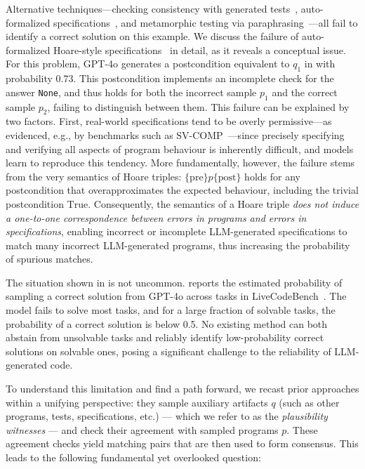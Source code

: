 \documentclass[acmsmall,screen,nonacm]{acmart}
\begin{document}
Alternative techniques---checking consistency with generated tests~\cite{chen2022codet}, auto-formalized specifications~\cite{endres2024can,misu2024towards}, and metamorphic testing via paraphrasing~\cite{wang2024validating}---all fail to identify a correct solution on this example. We discuss the failure of auto-formalized Hoare-style specifications~\cite{hoare1969axiomatic} in detail, as it reveals a conceptual issue. For this problem, GPT-4o generates a postcondition equivalent to $q_1$ in  with probability 0.73. This postcondition implements an incomplete check for the answer \texttt{None}, and thus holds for both the incorrect sample $p_1$ and the correct sample $p_2$, failing to distinguish between them. This failure can be explained by two factors. First, real-world specifications tend to be overly permissive---as evidenced, e.g., by benchmarks such as SV-COMP~\cite{beyer2012competition}---since precisely specifying and verifying all aspects of program behaviour is inherently difficult, and models learn to reproduce this tendency. More fundamentally, however, the failure stems from the very semantics of Hoare triples: $\{\mathrm{pre}\} p \{\mathrm{post}\}$ holds for any postcondition that overapproximates the expected behaviour, including the trivial postcondition $\mathrm{True}$. Consequently, the semantics of a Hoare triple \emph{does not induce a one-to-one correspondence between errors in programs and errors in specifications}, enabling incorrect or incomplete LLM-generated specifications to match many incorrect LLM-generated programs, thus increasing the probability of spurious matches.


The situation shown in  is not uncommon.  reports the estimated probability of sampling a correct solution from GPT-4o across tasks in LiveCodeBench~\cite{jain2024livecodebench}. The model fails to solve most tasks, and for a large fraction of solvable tasks, the probability of a correct solution is below 0.5. No existing method can both abstain from unsolvable tasks and reliably identify low-probability correct solutions on solvable ones, posing a significant challenge to the reliability of LLM-generated code.

To understand this limitation and find a path forward, we recast prior approaches within a unifying perspective: they sample auxiliary artifacts $q$ (such as other programs, tests, specifications, etc.) --- which we refer to as the \emph{plausibility witnesses} --- and check their agreement with sampled programs $p$. These agreement checks yield matching pairs that are then used to form consensus. This leads to the following fundamental yet overlooked question:
\end{document}
